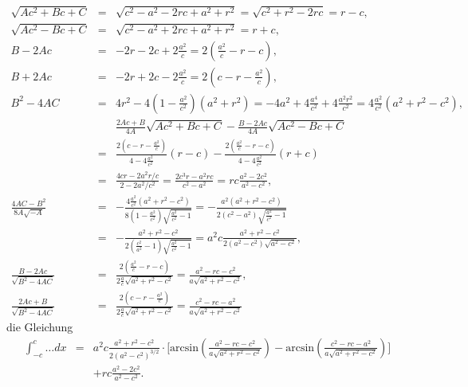 \documentclass{book}
\renewcommand{\arcsin}{\text{arcsin}}
\begin{document}
\begin{eqnarray}
\sqrt{Ac^2 + Bc + C} & = & \sqrt{c^2 - a^2 - 2rc + a^2 + r^2} = \sqrt{c^2 + r^2 - 2rc} = r - c,\\
\sqrt{Ac^2 - Bc + C} & = & \sqrt{c^2 - a^2 + 2rc + a^2 + r^2} = r + c,\\
B - 2Ac & = & -2r - 2c + 2\frac{a^2}{c} = 2\left(\frac{a^2}{c} - r - c\right),\\
B + 2Ac & = & -2r + 2c - 2\frac{a^2}{c} = 2\left(c - r - \frac{a^2}{c}\right),\\
B^2 - 4AC & = & 4r^2 - 4\left(1 - \frac{a^2}{c^2}\right)\left(a^2 + r^2\right) = -4a^2 + 4\frac{a^4}{c^2} + 4\frac{a^2r^2}{c^2} = 4\frac{a^2}{c^2}\left(a^2 + r^2 - c^2\right),\\
&&\frac{2Ac + B}{4A}\sqrt{Ac^2 + Bc + C} - \frac{B - 2Ac}{4A}\sqrt{Ac^2 - Bc + C}\nonumber\\
& = & \frac{2\left(c - r - \frac{a^2}{c}\right)}{4 - 4\frac{a^2}{c^2}}\left(r - c\right) - \frac{2\left(\frac{a^2}{c} - r - c\right)}{4 - 4\frac{a^2}{c^2}}\left(r + c\right)\nonumber\\
& = & \frac{4cr - 2a^2r/c}{2 - 2a^2/c^2} = \frac{2c^3r - a^2rc}{c^2 - a^2} = rc\frac{a^2 - 2c^2}{a^2 - c^2},\\
\frac{4AC - B^2}{8A\sqrt{ - A}} & = & -\frac{4\frac{a^2}{c^2}\left(a^2 + r^2 - c^2\right)}{8\left(1 - \frac{a^2}{c^2}\right)\sqrt{\frac{a^2}{c^2} - 1}} = -\frac{a^2\left(a^2 + r^2 - c^2\right)}{2\left(c^2 - a^2\right)\sqrt{\frac{a^2}{c^2} - 1}}\nonumber\\
& = & -\frac{a^2 + r^2 - c^2}{2\left(\frac{c^2}{a^2} - 1\right)\sqrt{\frac{a^2}{c^2} - 1}} = a^2c\frac{a^2 + r^2 - c^2}{2\left(a^2 - c^2\right)\sqrt{a^2 - c^2}},\\
\frac{B - 2Ac}{\sqrt{B^2 - 4AC}} & = & \frac{2\left(\frac{a^2}{c} - r - c\right)}{2\frac{a}{c}\sqrt{a^2 + r^2 - c^2}} = \frac{a^2 - rc - c^2}{a\sqrt{a^2 + r^2 - c^2}},\\
\frac{2Ac + B}{\sqrt{B^2 - 4AC}} & = & \frac{2\left(c - r - \frac{a^2}{c}\right)}{2\frac{a}{c}\sqrt{a^2 + r^2 - c^2}} = \frac{c^2 - rc - a^2}{a\sqrt{a^2 + r^2 - c^2}}
\end{eqnarray}
%
die Gleichung
%
\begin{eqnarray}
\int_{ - c}^c\dotsc dx & = & a^2c\frac{a^2 + r^2 - c^2}{2\left(a^2 - c^2\right)^{3/2}}\cdot\bigg[\arcsin\left(\frac{a^2 - rc - c^2}{a\sqrt{a^2 + r^2 - c^2}}\right) - \arcsin\left(\frac{c^2 - rc - a^2}{a\sqrt{a^2 + r^2 - c^2}}\right)\bigg]\nonumber\\
&& + rc\frac{a^2 - 2c^2}{a^2 - c^2}.
\end{eqnarray}
\end{document}
